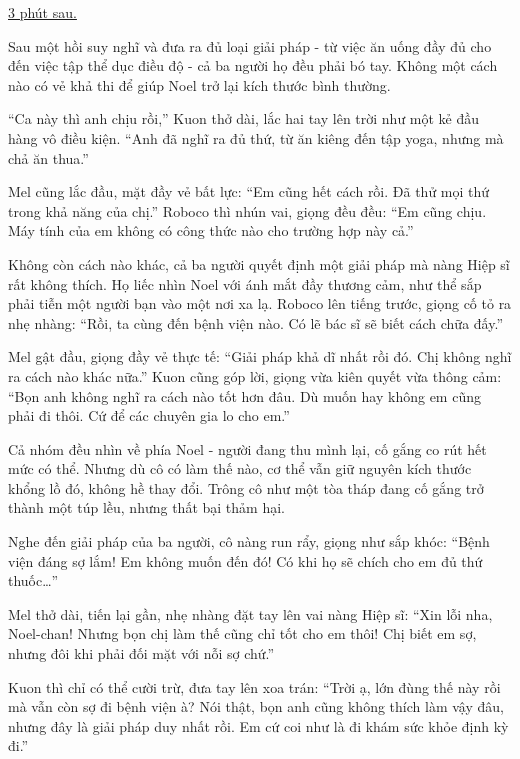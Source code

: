 \documentclass[../main.tex]{subfiles}
\begin{document}
\begin{center}
  \uline{3 phút sau.}
\end{center}

Sau một hồi suy nghĩ và đưa ra đủ loại giải pháp - từ việc ăn uống đầy đủ cho đến việc tập thể dục điều độ - cả ba người họ đều phải bó tay. Không một cách nào có vẻ khả thi để giúp Noel trở lại kích thước bình thường.

``Ca này thì anh chịu rồi,'' Kuon thở dài, lắc hai tay lên trời như một kẻ đầu hàng vô điều kiện. ``Anh đã nghĩ ra đủ thứ, từ ăn kiêng đến tập yoga, nhưng mà chả ăn thua.''

Mel cũng lắc đầu, mặt đầy vẻ bất lực: ``Em cũng hết cách rồi. Đã thử mọi thứ trong khả năng của chị.'' Roboco thì nhún vai, giọng đều đều: ``Em cũng chịu. Máy tính của em không có công thức nào cho trường hợp này cả.''

Không còn cách nào khác, cả ba người quyết định một giải pháp mà nàng Hiệp sĩ rất không thích. Họ liếc nhìn Noel với ánh mắt đầy thương cảm, như thể sắp phải tiễn một người bạn vào một nơi xa lạ. Roboco lên tiếng trước, giọng cố tỏ ra nhẹ nhàng: ``Rồi, ta cùng đến bệnh viện nào. Có lẽ bác sĩ sẽ biết cách chữa đấy.''

Mel gật đầu, giọng đầy vẻ thực tế: ``Giải pháp khả dĩ nhất rồi đó. Chị không nghĩ ra cách nào khác nữa.'' Kuon cũng góp lời, giọng vừa kiên quyết vừa thông cảm: ``Bọn anh không nghĩ ra cách nào tốt hơn đâu. Dù muốn hay không em cũng phải đi thôi. Cứ để các chuyên gia lo cho em.''

Cả nhóm đều nhìn về phía Noel - người đang thu mình lại, cố gắng co rút hết mức có thể. Nhưng dù cô có làm thế nào, cơ thể vẫn giữ nguyên kích thước khổng lồ đó, không hề thay đổi. Trông cô như một tòa tháp đang cố gắng trở thành một túp lều, nhưng thất bại thảm hại.

Nghe đến giải pháp của ba người, cô nàng run rẩy, giọng như sắp khóc: ``Bệnh viện đáng sợ lắm! Em không muốn đến đó! Có khi họ sẽ chích cho em đủ thứ thuốc\dots''

Mel thở dài, tiến lại gần, nhẹ nhàng đặt tay lên vai nàng Hiệp sĩ: ``Xin lỗi nha, Noel-chan! Nhưng bọn chị làm thế cũng chỉ tốt cho em thôi! Chị biết em sợ, nhưng đôi khi phải đối mặt với nỗi sợ chứ.''

Kuon thì chỉ có thể cười trừ, đưa tay lên xoa trán: ``Trời ạ, lớn đùng thế này rồi mà vẫn còn sợ đi bệnh viện à? Nói thật, bọn anh cũng không thích làm vậy đâu, nhưng đây là giải pháp duy nhất rồi. Em cứ coi như là đi khám sức khỏe định kỳ đi.''
\end{document}
